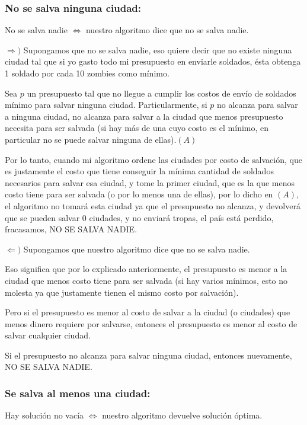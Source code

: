 \subsubsection{No se salva ninguna ciudad:}

No se salva nadie $\Longleftrightarrow$ nuestro algoritmo dice que no se salva nadie.

$\Longrightarrow )$ Supongamos que no se salva nadie, eso quiere decir que no existe ninguna ciudad tal que si yo gasto todo mi presupuesto en enviarle soldados, ésta obtenga 1 soldado por cada 10 zombies como mínimo.

Sea $p$ un presupuesto tal que no llegue a cumplir los costos de envío de soldados mínimo para salvar ninguna ciudad.
Particularmente, si $p$ no alcanza para salvar a ninguna ciudad, no alcanza para salvar a la ciudad que menos presupuesto necesita para ser salvada (si hay más de una cuyo costo es el mínimo, en particular no se puede salvar ninguna de ellas).$(A)$

Por lo tanto, cuando mi algoritmo ordene las ciudades por costo de salvación, que es justamente el costo que tiene conseguir la mínima cantidad de soldados necesarios para salvar esa ciudad, y tome la primer ciudad, que es la que menos costo tiene para ser salvada (o por lo menos una de ellas), por lo dicho en $(A)$, el algoritmo no tomará esta ciudad ya que el presupuesto no alcanza, y devolverá que se pueden salvar 0 ciudades, y no enviará tropas, el país está perdido, fracasamos, NO SE SALVA NADIE.

$\Longleftarrow )$ Supongamos que nuestro algoritmo dice que no se salva nadie.

Eso significa que por lo explicado anteriormente, el presupuesto es menor a la ciudad que menos costo tiene para ser salvada (si hay varios mínimos, esto no molesta ya que justamente tienen el mismo costo por salvación).

Pero si el presupuesto es menor al costo de salvar a la ciudad (o ciudades) que menos dinero requiere por salvarse, entonces el presupuesto es menor al costo de salvar cualquier ciudad.

Si el presupuesto no alcanza para salvar ninguna ciudad, entonces nuevamente, NO SE SALVA NADIE.

\subsubsection{Se salva al menos una ciudad:}

Hay solución no vacía $\Longleftrightarrow$ nuestro algoritmo devuelve solución óptima.

